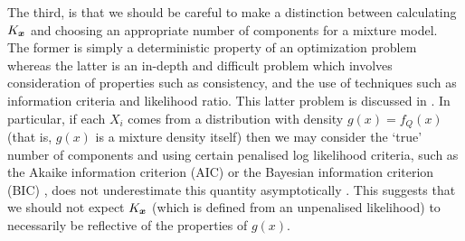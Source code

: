 	The third, is that we should be careful to make a distinction between calculating $K_{\bm{{x}}}$ and choosing an appropriate number of components for a mixture model. The former is simply a deterministic property of an optimization problem whereas the latter is an in-depth and difficult problem which involves consideration of properties such as consistency, and the use of techniques such as information criteria and likelihood ratio. This latter problem is discussed in \cite[Chapter 6]{McLachlan2004-ik}. In particular, if each $X_i$ comes from a distribution with density $g(x) = f_Q(x)$ (that is, $g(x)$ is a mixture density itself) then we may consider the `true' number of components and using certain penalised log likelihood criteria, such as the Akaike information criterion (AIC) \cite{Akaike1974-bl} or the Bayesian information criterion (BIC) \cite{Schwarz1978-ci}, does not underestimate this quantity asymptotically \cite{Leroux1992-ek}. This suggests that we should not expect $K_{\bm{{x}}}$ (which is defined from an unpenalised likelihood) to necessarily be reflective of the properties of $g(x)$.
 


	
